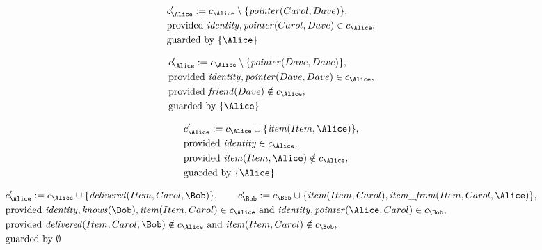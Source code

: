\begin{align*}
&
c'_
{
\Alice
}
 := 
c_
{
\Alice
}
 \setminus 
\{
\mathit{\detokenize{
pointer
}}
(
Carol
,
Dave
)
\}
,\\
&
\text{provided } 
\mathit{\detokenize{
identity
}}
,
\mathit{\detokenize{
pointer
}}
(
Carol
,
Dave
)
 \in c_
{
\Alice
}
,\\
&
\text{guarded by } \{
\Alice
\}
\end{align*}

\begin{align*}
&
c'_
{
\Alice
}
 := 
c_
{
\Alice
}
 \setminus 
\{
\mathit{\detokenize{
pointer
}}
(
Dave
,
Dave
)
\}
,\\
&
\text{provided } 
\mathit{\detokenize{
identity
}}
,
\mathit{\detokenize{
pointer
}}
(
Dave
,
Dave
)
 \in c_
{
\Alice
}
,\\
&
\text{provided } 
\mathit{\detokenize{
friend
}}
(
Dave
)
 \notin c_
{
\Alice
}
,\\
&
\text{guarded by } \{
\Alice
\}
\end{align*}

\begin{align*}
&
c'_
{
\Alice
}
 := 
c_
{
\Alice
}
 \cup 
\{
\mathit{\detokenize{
item
}}
(
Item
,
\Alice
)
\}
,\\
&
\text{provided } 
\mathit{\detokenize{
identity
}}
 \in c_
{
\Alice
}
,\\
&
\text{provided } 
\mathit{\detokenize{
item
}}
(
Item
,
\Alice
)
 \notin c_
{
\Alice
}
,\\
&
\text{guarded by } \{
\Alice
\}
\end{align*}

\begin{align*}
&
c'_
{
\Alice
}
 := 
c_
{
\Alice
}
 \cup 
\{
\mathit{\detokenize{
delivered
}}
(
Item
,
Carol
,
\Bob
)
\}
, \qquad 
c'_
{
\Bob
}
 := 
c_
{
\Bob
}
 \cup 
\{
\mathit{\detokenize{
item
}}
(
Item
,
Carol
)
,
\mathit{\detokenize{
item_from
}}
(
Item
,
Carol
,
\Alice
)
\}
,\\
&
\text{provided } 
\mathit{\detokenize{
identity
}}
,
\mathit{\detokenize{
knows
}}
(
\Bob
)
,
\mathit{\detokenize{
item
}}
(
Item
,
Carol
)
 \in c_
{
\Alice
}
 \text{ and } 
\mathit{\detokenize{
identity
}}
,
\mathit{\detokenize{
pointer
}}
(
\Alice
,
Carol
)
 \in c_
{
\Bob
}
,\\
&
\text{provided } 
\mathit{\detokenize{
delivered
}}
(
Item
,
Carol
,
\Bob
)
 \notin c_
{
\Alice
}
 \text{ and } 
\mathit{\detokenize{
item
}}
(
Item
,
Carol
)
 \notin c_
{
\Bob
}
,\\
&
\text{guarded by } \emptyset
\end{align*}
